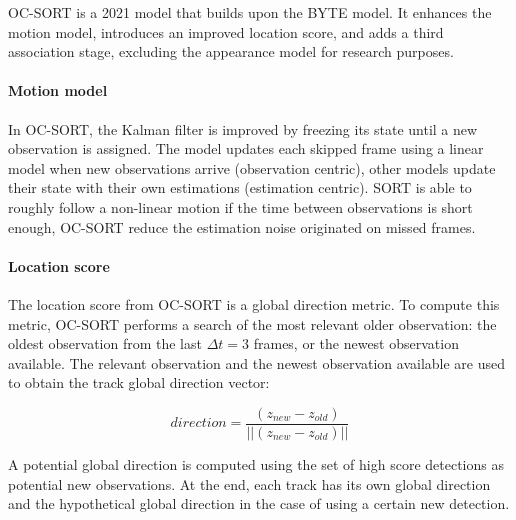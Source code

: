 
{
    \ac{OC-SORT}\cite{cao2023observation} is a 2021 model that builds upon the BYTE model. 
    It enhances the motion model, introduces an improved location score, and adds a third association stage, 
    excluding the appearance model for research purposes.
}

\paragraph{Motion model}

{
    In \ac{OC-SORT}, the Kalman filter is improved by freezing its state until a new observation is assigned. 
    The model updates each skipped frame using a linear model when new observations arrive (observation centric), 
    other models update their state with their own estimations (estimation centric). 
    \ac{SORT} is able to roughly follow a non-linear motion if the time between observations is short enough, 
    \ac{OC-SORT} reduce the estimation noise originated on missed frames.
} 

\paragraph{Location score}

{
    The location score from \ac{OC-SORT} is a global direction metric. 
    To compute this metric, \ac{OC-SORT} performs a search of the most relevant older observation:
    the oldest observation from the last $\Delta t=3$ frames, or the newest observation available.
    The relevant observation and the newest observation available are used to obtain the track global direction vector:
}

\begin{equation}
    \label{eqn:track direction}
    direction = \frac{(z_{new} - z_{old})}{||(z_{new} - z_{old})||}
\end{equation}

{
    A potential global direction is computed using the set of high score detections as potential new observations. 
    At the end, each track has its own global direction and the hypothetical global direction in the case of using a certain new detection.
}

